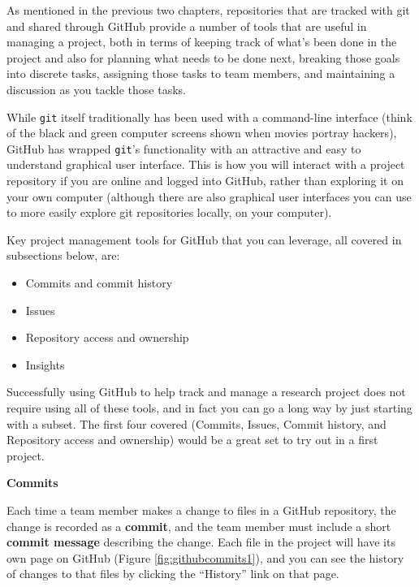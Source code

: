 \documentclass[]{tufte-book}
\providecommand{\tightlist}{%
  \setlength{\itemsep}{0pt}\setlength{\parskip}{0pt}}
\begin{document}
As mentioned in the previous two chapters, repositories that are tracked with
git and shared through GitHub provide a number of tools that are useful in
managing a project, both in terms of keeping track of what's been done in the
project and also for planning what needs to be done next, breaking those goals
into discrete tasks, assigning those tasks to team members, and maintaining a
discussion as you tackle those tasks.

While \texttt{git} itself traditionally has been used with a command-line interface
(think of the black and green computer screens shown when movies portray hackers),
GitHub has wrapped \texttt{git}'s functionality with an attractive and easy to
understand graphical user interface. This is how you will interact with a project
repository if you are online and logged into GitHub, rather than exploring it
on your own computer (although there are also graphical user interfaces you can
use to more easily explore git repositories locally, on your computer).

Key project management tools for GitHub that you can leverage, all covered in
subsections below, are:

\begin{itemize}
\tightlist
\item
  Commits and commit history
\item
  Issues
\item
  Repository access and ownership
\item
  Insights
\end{itemize}

Successfully using GitHub to help track and manage a research project does not
require using all of these tools, and in fact you can go a long way by just starting
with a subset. The first four covered (Commits, Issues, Commit history, and Repository access
and ownership) would be a great set to try out in a first project.

\textbf{Commits}

Each time a team member makes a change to files in a GitHub repository, the change is
recorded as a \textbf{commit}, and the team member must include a short \textbf{commit message}
describing the change. Each file in the project will have its own page on GitHub
(Figure \ref{fig:githubcommits1}), and you can see the history of changes to that
files by clicking the ``History'' link on that page.
\end{document}
